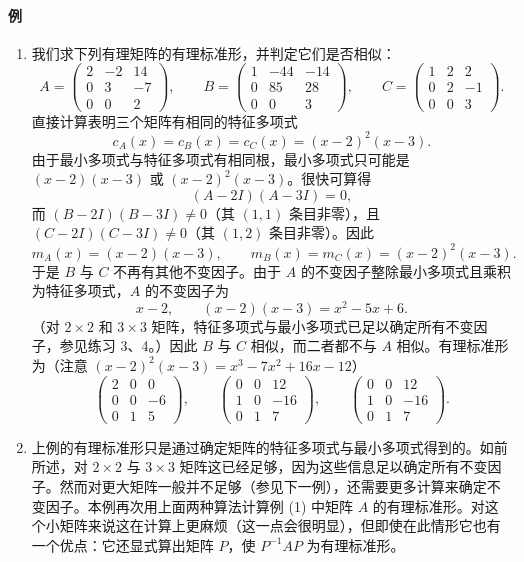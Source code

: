 \paragraph{例}
\begin{enumerate}[label=(\arabic*)]
\item 我们求下列有理矩阵的有理标准形，并判定它们是否相似：
\[
A=\begin{pmatrix}2&-2&14\\0&3&-7\\0&0&2\end{pmatrix},\qquad
B=\begin{pmatrix}1&-44&-14\\0&85&28\\0&0&3\end{pmatrix},\qquad
C=\begin{pmatrix}1&2&2\\0&2&-1\\0&0&3\end{pmatrix}.
\]
直接计算表明三个矩阵有相同的特征多项式
\[
c_A(x)=c_B(x)=c_C(x)=(x-2)^2(x-3).
\]
由于最小多项式与特征多项式有相同根，最小多项式只可能是 $(x-2)(x-3)$ 或 $(x-2)^2(x-3)$。很快可算得
\[
(A-2I)(A-3I)=0,
\]
而 $(B-2I)(B-3I)\neq0$（其 $(1,1)$ 条目非零），且 $(C-2I)(C-3I)\neq0$（其 $(1,2)$ 条目非零）。因此
\[
m_A(x)=(x-2)(x-3),\qquad m_B(x)=m_C(x)=(x-2)^2(x-3).
\]
于是 $B$ 与 $C$ 不再有其他不变因子。由于 $A$ 的不变因子整除最小多项式且乘积为特征多项式，$A$ 的不变因子为
\[
x-2,\qquad (x-2)(x-3)=x^2-5x+6.
\]
（对 $2\times2$ 和 $3\times3$ 矩阵，特征多项式与最小多项式已足以确定所有不变因子，参见练习 3、4。）因此 $B$ 与 $C$ 相似，而二者都不与 $A$ 相似。有理标准形为（注意 $(x-2)^2(x-3)=x^3-7x^2+16x-12$）
\[
\begin{pmatrix}2&0&0\\0&0&-6\\0&1&5\end{pmatrix},
\qquad
\begin{pmatrix}0&0&12\\1&0&-16\\0&1&7\end{pmatrix},
\qquad
\begin{pmatrix}0&0&12\\1&0&-16\\0&1&7\end{pmatrix}.
\]

\item 上例的有理标准形只是通过确定矩阵的特征多项式与最小多项式得到的。如前所述，对 $2\times2$ 与 $3\times3$ 矩阵这已经足够，因为这些信息足以确定所有不变因子。然而对更大矩阵一般并不足够（参见下一例），还需要更多计算来确定不变因子。本例再次用上面两种算法计算例 (1) 中矩阵 $A$ 的有理标准形。对这个小矩阵来说这在计算上更麻烦（这一点会很明显），但即使在此情形它也有一个优点：它还显式算出矩阵 $P$，使 $P^{-1}AP$ 为有理标准形。


\end{enumerate}
